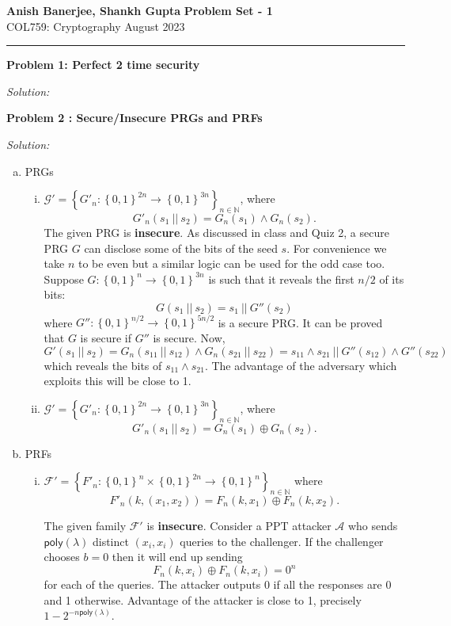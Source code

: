 \documentclass[a4paper, 11pt]{article}
\newcommand{\hr}{\noindent\rule{7in}{2.8pt}}
\newenvironment{solution}
    {\textit{Solution:}}
    {\clearpage}
\newcommand{\prob}[1]{\begin{mdframed}[backgroundcolor=gray!20] \textbf{Problem #1}\end{mdframed}}
\newcommand{\bit}{\left\{0, 1\right\}}
\newcommand{\poly}{\mathsf{poly}}
\newcommand{\N}{\mathbb{N}}
\newcommand{\calA}{\mathcal{A}}
\newcommand{\calF}{\mathcal{F}}
\newcommand{\calG}{\mathcal{G}}
\newcommand{\set}[1]{\left\{ #1 \right\}}
\begin{document}
\noindent
\large\textbf{Anish Banerjee, Shankh Gupta} \hfill \textbf{Problem Set - 1}   \\
\normalsize COL759: Cryptography \hfill August 2023\\
\hr


\prob{1: Perfect 2 time security}
\begin{solution}

\end{solution}


\prob{2 : Secure/Insecure PRGs and PRFs}
\begin{solution}
    \begin{enumerate}[(a)]
        \item PRGs
        \begin{enumerate}[i.]
            \item $\calG' = \set{G'_n : \bit^{2n} \to \bit^{3n}}_{n \in \N}$, where $$ G'_n(s_1 ~||~ s_2) = G_n(s_1) \wedge G_n(s_2).$$ 
            The given PRG is \textbf{insecure}. As discussed in class and Quiz 2, a secure PRG $G$ can disclose some of the bits of the seed $s$. For convenience we take $n$ to be even but a similar logic can be used for the odd case too. Suppose $G:\bit^n\rightarrow\bit^{3n}$ is such that it reveals the first $n/2$ of its bits: $$G(s_1 ~||~ s_2)=s_1 ~||~ G''(s_2)$$ where $G'':\bit^{n/2}\rightarrow\bit^{5n/2}$ is a secure PRG. It can be proved that $G$ is secure if $G''$ is secure. Now, 
            $$G'(s_1 ~||~ s_2)=G_n(s_{11} ~||~ s_{12}) \wedge G_n(s_{21} ~||~ s_{22})=s_{11}\wedge s_{21} ~||~ G''(s_{12})\wedge G''(s_{22})$$
            which reveals the bits of  $s_{11}\wedge s_{21}$. The advantage of the adversary which exploits this will be close to 1.


            \item $\calG' = \set{G'_n : \bit^{2n} \to \bit^{3n}}_{n \in \N}$, where $$ G'_n(s_1 ~||~ s_2) = G_n(s_1) \oplus G_n(s_2).$$  
        \end{enumerate}
        \item PRFs
        \begin{enumerate}[i.]
            \item $\calF' = \set{F'_n:\bit^{n} \times \bit^{2n} \to \bit^{n}}_{n\in \N}$ where $$F'_n(k, (x_1, x_2)) = F_n(k, x_1) \oplus F_n(k, x_2).$$  
            
            The given family $\calF'$ is \textbf{insecure}. Consider a PPT attacker $\calA$ who sends $\poly(\lambda)$ distinct $(x_i,x_i)$ queries to the  challenger. If the challenger chooses $b=0$ then it will end up sending $$F_n(k, x_i) \oplus F_n(k, x_i)=0^n$$ for each of the queries. The attacker outputs 0 if all the responses are 0 and 1 otherwise. Advantage of the attacker is close to 1, precisely $1-2^{-n\poly(\lambda)}$.


\end{enumerate}
\end{enumerate}
\end{solution}
\end{document}
